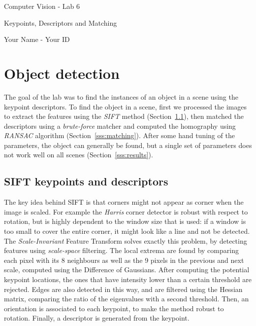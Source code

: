 \documentclass[a4paper]{article}
\begin{document}
\begin{center}
    {\Large Computer Vision - Lab 6}

    \vspace*{0.25cm}

    {\Large Keypoints, Descriptors and Matching}

    \vspace*{0.35cm}

    {\large Your Name - Your ID}
\end{center}

\section{Object detection}

The goal of the lab was to find the instances of an object in a scene using the keypoint descriptors.
To find the object in a scene, first we processed the images to extract the features using the \emph{SIFT} method (Section~\ref{sss:sift}), then matched the descriptors using a \emph{brute-force} matcher and computed the homography using \emph{RANSAC} algorithm (Section~\ref{sss:matching}).
After some hand tuning of the parameters, the object can generally be found, but a single set of parameters does not work well on all scenes (Section~\ref{sss:results}).

\subsection{SIFT keypoints and descriptors}
\label{sss:sift}
The key idea behind SIFT is that corners might not appear as corner when the image is scaled. For example the \emph{Harris} corner detector is robust with respect to rotation, but is highly dependent to the window size that is used: if a window is too small to cover the entire corner, it might look like a line and not be detected.
The \emph{Scale-Invariant} Feature Transform solves exactly this problem, by detecting features using \emph{scale-space} filtering.
The local extrema are found by comparing each pixel with its 8 neighbours as well as the 9 pixels in the previous and next scale, computed using the Difference of Gaussians.
After computing the potential keypoint locations, the ones that have intensity lower than a certain threshold are rejected.
Edges are also detected in this way, and are filtered using the Hessian matrix, comparing the ratio of the eigenvalues with a second threshold. Then, an orientation is associated to each keypoint, to make the method robust to rotation. Finally, a descriptor is generated from the keypoint.
\end{document}
